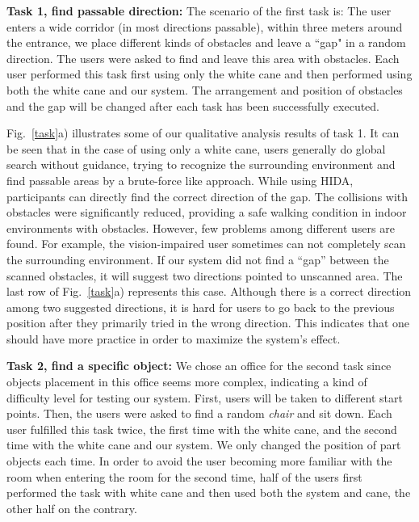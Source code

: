 \documentclass[10pt,twocolumn,letterpaper]{article}
\begin{document}
\noindent
\textbf{Task 1, find passable direction:}
The scenario of the first task is: The user enters a wide corridor (in most directions passable), within three meters around the entrance, we place different kinds of obstacles and leave a ``gap" in a random direction. The users were asked to find and leave this area with obstacles. Each user performed this task first using only the white cane and then performed using both the white cane and our system. The arrangement and position of obstacles and the gap will be changed after each task has been successfully executed.


Fig.~\ref{task}a) illustrates some of our qualitative analysis results of task 1. It can be seen that in the case of using only a white cane, users generally do global search without guidance, trying to recognize the surrounding environment and find passable areas by a brute-force like approach. While using HIDA, participants can directly find the correct direction of the gap. The collisions with obstacles were significantly reduced, providing a safe walking condition in indoor environments with obstacles. However, few problems among different users are found. For example, the vision-impaired user sometimes can not completely scan the surrounding environment. If our system did not find a ``gap'' between the scanned obstacles, it will suggest two directions pointed to unscanned area. The last row of Fig.~\ref{task}a) represents this case. Although there is a correct direction among two suggested directions, it is hard for users to go back to the previous position after they primarily tried in the wrong direction. This indicates that one should have more practice in order to maximize the system's effect.

\noindent
\textbf{Task 2, find a specific object:}
We chose an office for the second task since objects placement in this office seems more complex, indicating a kind of difficulty level for testing our system. First, users will be taken to different start points. Then, the users were asked to find a random \emph{chair} and sit down. Each user fulfilled this task twice, the first time with the white cane, and the second time with the white cane and our system. We only changed the position of part objects each time. In order to avoid the user becoming more familiar with the room when entering the room for the second time, half of the users first performed the task with white cane and then used both the system and cane, the other half on the contrary. 
\end{document}
